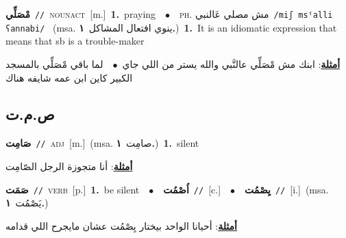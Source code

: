 \documentclass[10pt,a4paper,twoside]{article} %
\begin{document}
\begin{multicols}{2}
{\setlength\topsep{0pt}\textbf{\foreignlanguage{arabic}{مْصَلِّي}}\ {\color{gray}\texttt{//}\color{black}}\ \textsc{noun\textunderscore act}\ [m.]\ \textbf{1.}~praying\ \ $\bullet$\ \ \textsc{ph.} \color{gray} \foreignlanguage{arabic}{مش مصلي عَالنبي}\color{black}\ {\color{gray}\texttt{/{\sffamily miʃ msˤalli ʕannabi}/}\color{black}}\ \color{gray} (msa. \foreignlanguage{arabic}{ينوي افتعال المشاكل}~\foreignlanguage{arabic}{\textbf{١.}})\color{black}\ \textbf{1.}~It is an idiomatic expression that means that sb is a trouble-maker\  \begin{flushright}\color{gray}\foreignlanguage{arabic}{\textbf{\underline{\foreignlanguage{arabic}{أمثلة}}}: ابنك مش مْصَلِّي عالنَّبي والله يستر من اللي جاي\ $\bullet$\ \  لما باقي مْصَلِّي بالمسجد الكبير كاين ابن عمه شايفه هناك}\end{flushright}\color{black}} \vspace{2mm}

\vspace{-3mm}
\subsection*{\color{blue}\foreignlanguage{arabic}{ص.م.ت}\color{blue}{}} 

{\setlength\topsep{0pt}\textbf{\foreignlanguage{arabic}{صَامِت}}\ {\color{gray}\texttt{//}\color{black}}\ \textsc{adj}\ [m.]\ \color{gray}(msa. \foreignlanguage{arabic}{صامِت}~\foreignlanguage{arabic}{\textbf{١.}})\color{black}\ \textbf{1.}~silent\  \begin{flushright}\color{gray}\foreignlanguage{arabic}{\textbf{\underline{\foreignlanguage{arabic}{أمثلة}}}: أنا متجوزة الرجل الصّامِت}\end{flushright}\color{black}} \vspace{2mm}

{\setlength\topsep{0pt}\textbf{\foreignlanguage{arabic}{صَمَت}}\ {\color{gray}\texttt{//}\color{black}}\ \textsc{verb}\ [p.]\ \textbf{1.}~be silent\ \ $\bullet$\ \ \setlength\topsep{0pt}\textbf{\foreignlanguage{arabic}{اُصْمُت}}\ {\color{gray}\texttt{//}\color{black}}\ [c.]\ \ $\bullet$\ \ \setlength\topsep{0pt}\textbf{\foreignlanguage{arabic}{يِصْمُت}}\ {\color{gray}\texttt{//}\color{black}}\ [i.]\ \color{gray}(msa. \foreignlanguage{arabic}{يَصْمُت}~\foreignlanguage{arabic}{\textbf{١.}})\color{black}\  \begin{flushright}\color{gray}\foreignlanguage{arabic}{\textbf{\underline{\foreignlanguage{arabic}{أمثلة}}}: أحيانا الواحد بيختار يِصْمُت عشان مايجرح اللي قدامه}\end{flushright}\color{black}} \vspace{2mm}


\end{multicols}
\end{document}
